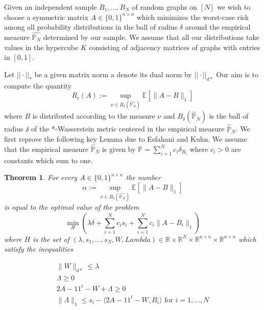 \documentclass[12pt]{amsart}
\newtheorem{theorem}[lemma]{Theorem}
\numberwithin{equation}{section}
\newcommand{\PP}{\mathbb{P}}
\newcommand{\RR}{\mathbb{R}}
\newcommand{\EE}{\mathbb{E}}
\begin{document}
Given an independent sample $B_1,\dots, B_N$ of random graphs on $[N]$ we wish to choose a symmetric matrix $A\in \{0,1\}^{n\times n}$ which minimizes the worst-case risk among all probability distributions in the ball of radius $\delta$ around the empirical measure $\hat{\mathbb{P}_N}$ determined by our sample. We assume that all our distributions take values in the hypercube $K$ consisting of adjacency matrices of graphs with entries in $[0,1]$. 

Let $||\cdot||_{*}$ be a given matrix norm a denote its dual norm by $||\cdot||_{d*}$ Our aim is to compute the quantity
\[R_{\epsilon}(A):=\sup_{\nu\in B_{\delta}(\hat{\mathbb{P}_N})}\EE[\|A-B\|_1]\]
where $B$ is distributed according to the measure $\nu$ and $B_\delta(\hat{\mathbb{P}}_N)$ is the ball of radius $\delta$ of the *-Wasserstein metric centered in the empirical measure $\hat{\mathbb{P}}_N$. We first reprove the following key Lemma due to Esfahani and Kuhn. We assume that the empirical measure $\hat{\mathbb{P}}_N$ is given by $\PP=\sum_{i=1}^Nc_i\delta_{B_i}$ where $c_i>0$ are constants which sum to one. 

\begin{theorem}
\label{teoError}
For every $A\in \{0,1\}^{n\times n}$ the number \[\alpha:=\sup_{\nu\in B_{\delta}(\hat{\mathbb{P}_N})} \EE[\|A-B\|_1]\]
is equal to the optimal value of the problem
\[\min_{H} \left(\lambda\delta +\sum_{i=1}^N c_is_i+\sum_{i=1}^Nc_i\|A-B_i\|_1\right)\]
where $H$ is the set of $(\lambda, s_1,\dots, s_N, W,Lambda)\in \RR\times\RR^N\times \RR^{n\times n} \times \RR^{n\times n}$ which satisfy the inequalities
\begin{center}
\[
\begin{array}{l}
\|W\|_{d*}\leq \lambda\\
\Lambda \geq 0\\
2A-11^t-W + \Lambda \geq 0\\
\|\Lambda\|_{1}\leq s_i-\langle 2A-11^t-W, B_i\rangle\text{ for $i=1,\dots, N$}
\end{array}
\]
\end{center}

\end{theorem}
\end{document}
